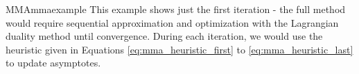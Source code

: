 \begin{example}{MMA}{mmaexample}
    This example shows just the first iteration - the full method would require sequential approximation and optimization with the Lagrangian duality method until convergence. During each iteration, we would use the heuristic given in Equations \eqref{eq:mma_heuristic_first} to \eqref{eq:mma_heuristic_last} to update asymptotes.  
\end{example}


 